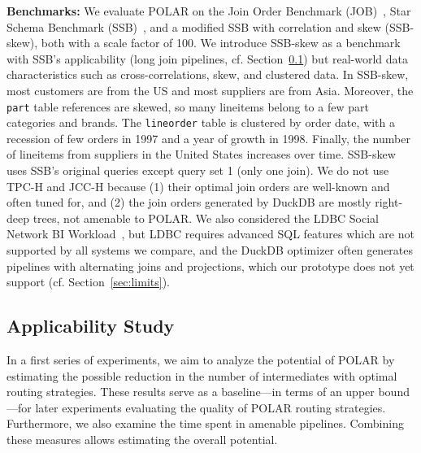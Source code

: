 \textbf{Benchmarks:} We evaluate POLAR on the Join Order Benchmark (JOB)~\cite{JoinOrderBenchmark}, Star Schema Benchmark (SSB)~\cite{SSB-ONeil2009-qs}, and a modified SSB with correlation and skew (SSB-skew), both with a scale factor of 100.
%
We introduce SSB-skew as a benchmark with SSB's applicability (long join pipelines, cf. Section~\ref{sec:potential-analysis}) but real-world data characteristics such as cross-correlations, skew, and clustered data. In SSB-skew, most customers are from the US and most suppliers are from Asia. Moreover, the \texttt{part} table references are skewed, so many lineitems belong to a few part categories and brands. The \texttt{lineorder} table is clustered by order date, with a recession of few orders in 1997 and a year of growth in 1998. Finally, the number of lineitems from suppliers in the United States increases over time. SSB-skew uses SSB's original queries except query set 1 (only one join).
%
We do not use TPC-H \cite{tpch} and JCC-H \cite{JCC-H} because (1) their optimal join orders are well-known and often tuned for, and (2) the join orders generated by DuckDB are mostly right-deep trees, not amenable to POLAR. We also considered the LDBC Social Network BI Workload~\cite{LDBC}, but LDBC requires advanced SQL features which are not supported by all systems we compare, and the DuckDB optimizer often generates pipelines with alternating joins and projections, which our prototype does not yet support (cf. Section~\ref{sec:limits}).
%

\subsection{Applicability Study}
\label{sec:potential-analysis}



In a first series of experiments, we aim to analyze the potential of POLAR by estimating the possible reduction in the number of intermediates with optimal routing strategies. These results serve as a baseline---in terms of an upper bound---for later experiments evaluating the quality of POLAR routing strategies. Furthermore, we also examine the time spent in amenable pipelines. Combining these measures allows estimating the overall potential.


